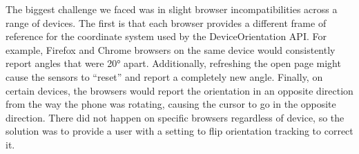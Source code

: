The biggest challenge we faced was in slight browser
incompatibilities across a range of devices. The first is that
each browser provides a different frame of reference for the
coordinate system used by the DeviceOrientation API. For example,
Firefox and Chrome browsers on the same device would consistently
report angles that were 20° apart. Additionally, refreshing
the open page might cause the sensors to ``reset'' and report
a completely new angle. Finally, on certain devices, the browsers
would report the orientation in an opposite direction from the way
the phone was rotating, causing the cursor to go in the opposite
direction. There did not happen on specific browsers regardless of
device, so the solution was to provide a user with a setting to
flip orientation tracking to correct it.
